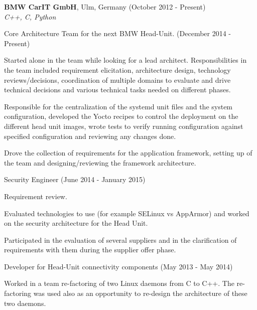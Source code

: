 \documentclass[alan.tex]{subfiles}
\begin{document}
  \item \textbf{BMW CarIT GmbH}, Ulm, Germany (October 2012 - Present)\\
    \emph{C++, C, Python}
    \begin{my_desc}
      \item[Core Architecture Team] for the next BMW Head-Unit. (December 2014 - Present)
        \begin{my_bullets}
          \item Started alone in the team while looking for a lead architect. Responsibilities in the team
            included requirement elicitation, architecture design, technology reviews/decisions,
            coordination of multiple domains to evaluate and drive technical decisions and various
            technical tasks needed on different phases.
          \item Responsible for the centralization of the systemd unit files and the system configuration, developed the
            Yocto recipes to control the deployment on the different head unit images, wrote tests to
            verify running configuration against specified configuration and reviewing any changes done.
          \item Drove the collection of requirements for the application framework, setting up of the team
            and designing/reviewing the framework architecture.
        \end{my_bullets}
      \item[Security Engineer] (June 2014 - January 2015)
        \begin{my_bullets}
          \item Requirement review.
          \item Evaluated technologies to use (for example SELinux vs AppArmor) and worked on the security architecture
            for the Head Unit.
          \item Participated in the evaluation of several suppliers and in the clarification of requirements with
            them during the supplier offer phase.
        \end{my_bullets}
      \item[Developer] for Head-Unit connectivity components (May 2013 - May 2014)
        \begin{my_bullets}
          \item Worked in a team re-factoring of two Linux daemons from C to C++.
            The re-factoring was used also as an opportunity to re-design the architecture of these two daemons.

\end{my_bullets}
\end{my_desc}
\end{document}
